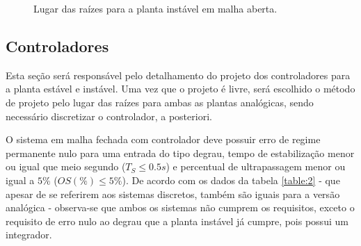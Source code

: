 \begin{figure}[H]
\begin{center}
\end{center}
\caption{Lugar das raízes para a planta instável em malha aberta.}
\label{rl:est} 
\end{figure}


\subsection{Controladores}

Esta seção será responsável pelo detalhamento do projeto dos controladores para a planta estável e instável. Uma vez que o projeto é livre, será escolhido o método de projeto pelo lugar das raízes para ambas as plantas analógicas, sendo necessário discretizar o controlador, a posteriori. 

O sistema em malha fechada com controlador deve possuir erro de regime permanente nulo para uma entrada do tipo degrau, tempo de estabilização menor ou igual que meio segundo ($T_S \leq 0.5s$) e percentual de ultrapassagem menor ou igual a $5\%$ ($OS(\%) \leq 5\%$). De acordo com os dados da tabela \ref{table:2} - que apesar de se referirem aos sistemas discretos, também são iguais para a versão analógica - observa-se que ambos os sistemas não cumprem os requisitos, exceto o requisito de erro nulo ao degrau que a planta instável já cumpre, pois possui um integrador. 

